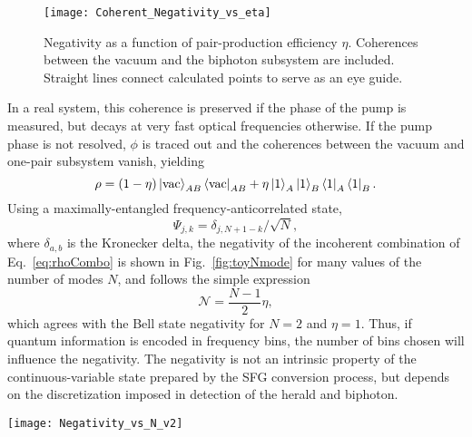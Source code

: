 \documentclass[twocolumn,amssymb, nobibnotes, showpacs, aps, pra,10pt]{revtex4-1}
\begin{document}
\begin{figure}[htb]
\begin{center}
\texttt{[image: Coherent\_Negativity\_vs\_eta]}
\caption{Negativity as a function of pair-production efficiency $\eta$. Coherences between the vacuum and the biphoton subsystem are included.  Straight lines connect calculated points to serve as an eye guide.}
\label{fig:toyCoherent}
\end{center}
\end{figure}

In a real system, this coherence is preserved if the phase of the pump is measured, but decays at very fast optical frequencies otherwise. If the pump phase is not resolved, $\phi$ is traced out and  the coherences between the vacuum and one-pair subsystem vanish, yielding
\begin{equation} \label{eq:rhoCombo}
\rho = (1-\eta) \ket{\text{vac}}_{AB} \bra{\text{vac}}_{AB} + \eta \ket{1}_A \ket{1}_B  \bra{1}_A \bra{1}_B.
\end{equation}
Using a maximally-entangled frequency-anticorrelated state,
\begin{equation}
\Psi_{j,k} = \delta_{j,N+1-k}/\sqrt{N},
\end{equation}
where $\delta_{a,b}$ is the Kronecker delta, the negativity of the incoherent combination of Eq.\ \eqref{eq:rhoCombo} is shown in Fig.\ \ref{fig:toyNmode} for many values of the number of modes $N$, and follows the simple expression
\begin{equation} \label{eq:toyNegativityScaling}
\mathcal{N} = \frac{N-1}{2} \eta,
\end{equation}
which agrees with the Bell state negativity for $N=2$ and $\eta=1$. Thus, if quantum information is encoded in frequency bins, the number of bins chosen will influence the negativity. The negativity is not an intrinsic property of the continuous-variable state prepared by the SFG conversion process, but depends on the discretization imposed in detection of the herald and biphoton.

\phantom{t}
\begin{figure*}[htb]
\begin{center}
\texttt{[image: Negativity\_vs\_N\_v2]}
\caption{Negativity $\mathcal{N}(\rho)$ vs. $\eta$ for multiple numbers of frequency modes, $N$. The input density matrices for this calculation have no coherence between the vacuum and biphoton subsystems.}
\label{fig:toyNmode}
\end{center}
\end{figure*}
\end{document}
